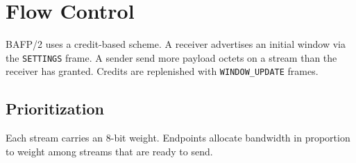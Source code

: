 \section{Flow Control}
BAFP/2 uses a credit-based scheme. A receiver advertises an initial window via the
\texttt{SETTINGS} frame. A sender  send more payload octets on a stream than
the receiver has granted. Credits are replenished with \texttt{WINDOW\_UPDATE} frames.

\subsection{Prioritization}
Each stream carries an 8-bit weight. Endpoints  allocate bandwidth in
proportion to weight among streams that are ready to send.
